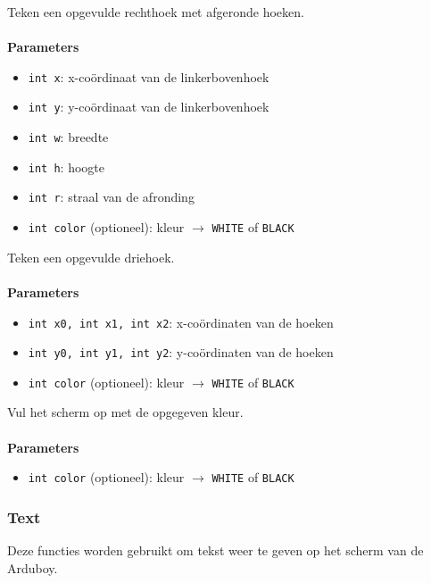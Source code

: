 \documentclass[11pt,fleqn]{book} %
\begin{document}
\pagebreak

\begin{libf}[fillRoundRect(x, y, w, h, r, \emph{color=WHITE})]
	Teken een opgevulde rechthoek met afgeronde hoeken.\\ \\
	\textbf{Parameters}
	\begin{itemize}
		\item \texttt{int x}: x-coördinaat van de linkerbovenhoek
		\item \texttt{int y}: y-coördinaat van de linkerbovenhoek
		\item \texttt{int w}: breedte
		\item \texttt{int h}: hoogte
		\item \texttt{int r}: straal van de afronding
		\item \texttt{int color} (optioneel): kleur $\rightarrow$ \texttt{WHITE} of \texttt{BLACK}
	\end{itemize}
\end{libf}

\begin{libf}[fillTriangle(x0, y0, x1, y1, x2, y2, \emph{color=WHITE})]
	Teken een opgevulde driehoek.\\ \\
	\textbf{Parameters}
	\begin{itemize}
		\item \texttt{int x0, int x1, int x2}: x-coördinaten van de hoeken
		\item \texttt{int y0, int y1, int y2}: y-coördinaten van de hoeken
		\item \texttt{int color} (optioneel): kleur $\rightarrow$ \texttt{WHITE} of \texttt{BLACK}
	\end{itemize}
\end{libf}

\begin{libf}[fillScreen(\emph{color=WHITE})]
	Vul het scherm op met de opgegeven kleur.\\ \\
	\textbf{Parameters}
	\begin{itemize}
		\item \texttt{int color} (optioneel): kleur $\rightarrow$ \texttt{WHITE} of \texttt{BLACK}
	\end{itemize}
\end{libf}

\subsubsection{Text}
Deze functies worden gebruikt om tekst weer te geven op het scherm van de Arduboy.
\end{document}
